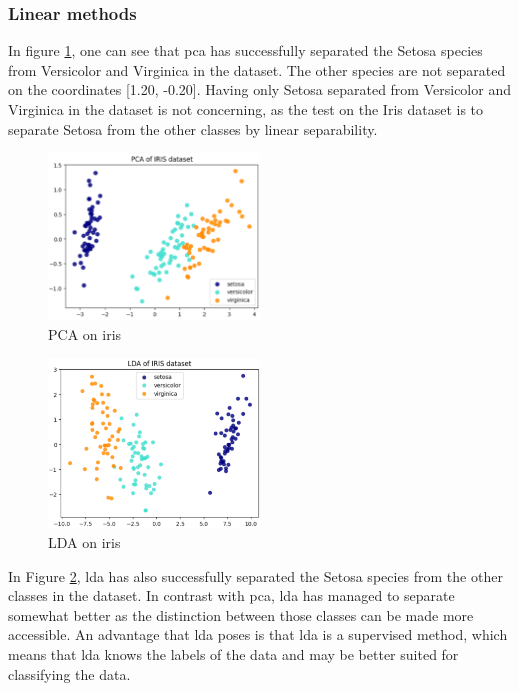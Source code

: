\subsubsection{Linear methods}\label{subsubsec:linear-methods-on-iris}
In figure \ref{fig:iris-pca}, one can see that \gls{pca} has successfully separated the Setosa species from Versicolor and Virginica in the dataset. The other species are not separated on the coordinates [1.20, -0.20]. Having only Setosa separated from Versicolor and Virginica in the dataset is not concerning, as the test on the Iris dataset is to separate Setosa from the other classes by linear separability.

\begin{figure}[htb!]
    \centering
    \includegraphics[width=0.5\textwidth]{figures/theory-example-figures/iris-pca.png}
    \caption{PCA on iris}
    \label{fig:iris-pca}
\end{figure}


\begin{figure}[htb!]
    \centering
    \includegraphics[width=0.5\textwidth]{figures/theory-example-figures/iris-lda.png}
    \caption{LDA on iris}
    \label{fig:iris-lda}
\end{figure}

In Figure \ref{fig:iris-lda}, \gls{lda} has also successfully separated the Setosa species from the other classes in the dataset. In contrast with \gls{pca}, \gls{lda} has managed to separate somewhat better as the distinction between those classes can be made more accessible. An advantage that \gls{lda} poses is that \gls{lda} is a supervised method, which means that  \gls{lda} knows the labels of the data and may be better suited for classifying the data.


